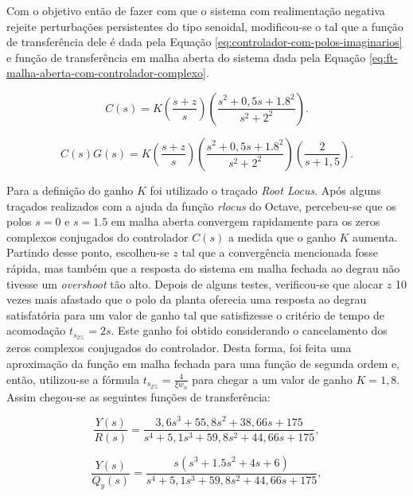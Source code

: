 Com o objetivo então de fazer com que o sistema com realimentação negativa
rejeite perturbações persistentes do tipo senoidal, modificou-se o tal que a
função de transferência dele é dada pela Equação
\ref{eq:controlador-com-polos-imaginarios} e função de transferência em malha
aberta do sistema dada pela Equação
\ref{eq:ft-malha-aberta-com-controlador-complexo}.

\begin{equation}
    \label{eq:controlador-com-polos-imaginarios}
    C(s) = K\left(\frac{s + z}{s}\right)\left(\frac{s^2 + 0,5s + 1.8^2}{s^2 + 2^2}\right).
\end{equation}

\begin{equation}
    \label{eq:ft-malha-aberta-com-controlador-complexo}
    C(s)G(s) = K\left(\frac{s + z}{s}\right)
    \left(\frac{s^2 + 0,5s + 1.8^2}{s^2 + 2^2}\right)
    \left(\frac{2}{s+1,5}\right).
\end{equation}

Para a definição do ganho $K$ foi utilizado o traçado \textit{Root Locus}. Após
alguns traçados realizados com a ajuda da função \textit{rlocus} do Octave,
percebeu-se que os polos $s = 0$ e $s = 1.5$ em malha aberta convergem
rapidamente para os zeros complexos conjugados do controlador $C(s)$ a medida
que o ganho $K$ aumenta. Partindo desse ponto, escolheu-se $z$ tal que a
convergência mencionada fosse rápida, mas também que a resposta do sistema em
malha fechada ao degrau não tivesse um \textit{overshoot} tão alto. Depois de
alguns testes, verificou-se que alocar $z$ 10 vezes mais afastado que o polo da
planta oferecia uma resposta ao degrau satisfatória para um valor de ganho tal
que satisfizesse o critério de tempo de acomodação $t_{s_{2\%}} = 2s$. Este
ganho foi obtido considerando o cancelamento dos zeros complexos conjugados do
controlador. Desta forma, foi feita uma aproximação da função em malha fechada
para uma função de segunda ordem e, então, utilizou-se a fórmula $t_{s_{2\%}} =
\frac{4}{\xi w_{n}}$ para chegar a um valor de ganho $K = 1,8$. Assim chegou-se
as seguintes funções de transferência:

\begin{equation}
    \label{eq:y2r-solucionado-cenario4-c}
    \frac{Y(s)}{R(s)} = \frac{3,6s^3 + 55,8s^2 + 38,66s + 175}
    {s^4 + 5,1s^3 + 59,8s^2 + 44,66s + 175},
\end{equation}

\begin{equation}
    \label{eq:y2qy-solucionado-cenario4-c}
    \frac{Y(s)}{Q_{y}(s)} = \frac{s(s^3 + 1.5s^2 + 4s + 6)}
    {s^4 + 5,1s^3 + 59,8s^2 + 44,66s + 175},
\end{equation}

